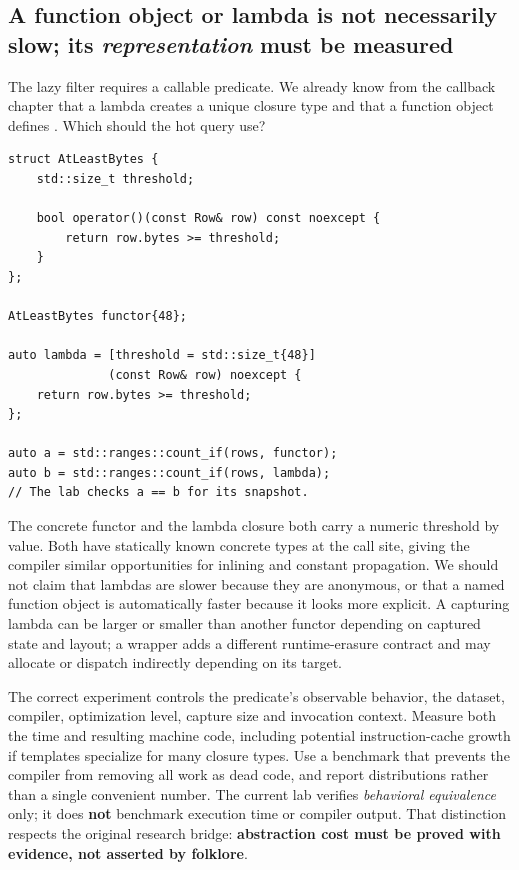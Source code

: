 \subsection{\texorpdfstring{A function object or lambda is not necessarily slow; its \emph{representation} must be measured}{A function object or lambda is not necessarily slow; its representation must be measured}}\label{05-engine-i-ch006-a-function-object-or-lambda-is-not-necessarily-slow-its-representation-must-be-measured}

\hypertarget{05-engine-i-ch006-a-function-object-or-lambda-is-not-necessarily-slow-its-representation-must-be-measured}{}

The lazy filter requires a callable predicate. We already know from the callback chapter that a lambda creates a unique closure type and that a function object defines . Which should the hot query use?

\begin{verbatim}
struct AtLeastBytes {
    std::size_t threshold;

    bool operator()(const Row& row) const noexcept {
        return row.bytes >= threshold;
    }
};

AtLeastBytes functor{48};

auto lambda = [threshold = std::size_t{48}]
              (const Row& row) noexcept {
    return row.bytes >= threshold;
};

auto a = std::ranges::count_if(rows, functor);
auto b = std::ranges::count_if(rows, lambda);
// The lab checks a == b for its snapshot.
\end{verbatim}

The concrete functor and the lambda closure both carry a numeric threshold by value. Both have statically known concrete types at the  call site, giving the compiler similar opportunities for inlining and constant propagation. We should not claim that lambdas are slower because they are anonymous, or that a named function object is automatically faster because it looks more explicit. A capturing lambda can be larger or smaller than another functor depending on captured state and layout; a  wrapper adds a different runtime-erasure contract and may allocate or dispatch indirectly depending on its target.

The correct experiment controls the predicate's observable behavior, the dataset, compiler, optimization level, capture size and invocation context. Measure both the time and resulting machine code, including potential instruction-cache growth if templates specialize for many closure types. Use a benchmark that prevents the compiler from removing all work as dead code, and report distributions rather than a single convenient number. The current lab verifies \emph{behavioral equivalence} only; it does \textbf{not} benchmark execution time or compiler output. That distinction respects the original research bridge: \textbf{abstraction cost must be proved with evidence, not asserted by folklore}.

